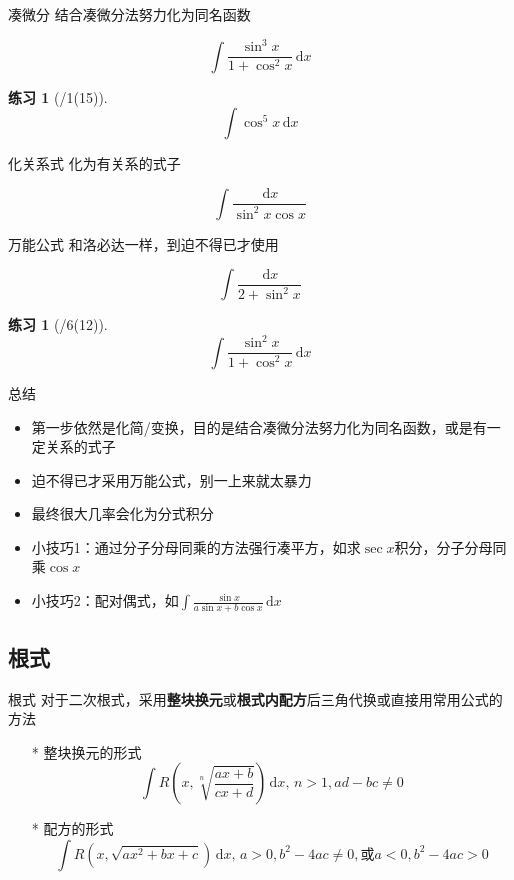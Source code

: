 \documentclass[UTF8]{ctexbeamer}
\def\diff{\,\mathrm{d}}
\newtheorem{exercise}[theorem]{练习} %
\begin{document}
\begin{frame}{凑微分}
结合凑微分法努力化为同名函数
\begin{example}
\[\int\frac{\sin^3x}{1+\cos^2 x}\diff x\]
\end{example}
\begin{exercise}[/1(15)]
\[\int\cos^5x\diff x\]
\end{exercise}
\end{frame}

\begin{frame}{化关系式}
化为有关系的式子
\begin{example}
\[\int\frac{\diff x}{\sin^2 x\cos x}\]
\end{example}
\end{frame}

\begin{frame}{万能公式}
和洛必达一样，到迫不得已才使用
\begin{example}
\[\int \frac{\diff x}{2+\sin^2 x}\]
\end{example}
\begin{exercise}[/6(12)]
\[\int\frac{\sin^2x}{1+\cos^2x}\diff x\]
\end{exercise}
\end{frame}

\begin{frame}{总结}
\begin{itemize}
	\item 第一步依然是化简/变换，目的是结合凑微分法努力化为同名函数，或是有一定关系的式子
	\item 迫不得已才采用万能公式，别一上来就太暴力
	\item 最终很大几率会化为分式积分
	\item 小技巧1：通过分子分母同乘的方法强行凑平方，如求$\sec x$积分，分子分母同乘$\cos x$
	\item 小技巧2：配对偶式，如$\displaystyle\int\frac{\sin x}{a\sin x+b\cos x}\diff x$
\end{itemize}
\end{frame}

\subsection{根式}
\begin{frame}
\subsectionpage
\end{frame}

\begin{frame}{根式}
对于二次根式，采用\textbf{整块换元}或\textbf{根式内配方}后三角代换或直接用常用公式的方法
\begin{itemize}
	\item[*] 整块换元的形式
	\[\int R\left(x,\sqrt[n]{\frac{ax+b}{cx+d}}\right)\diff x,\,n>1,ad-bc\ne 0\]
	\item[*] 配方的形式
	\[\int R\left(x,\sqrt{ax^2+bx+c}\right)\diff x,\,a>0,b^2-4ac\ne 0,\mbox{或}a<0,b^2-4ac>0\]
\end{itemize}
\end{frame}
\end{document}
